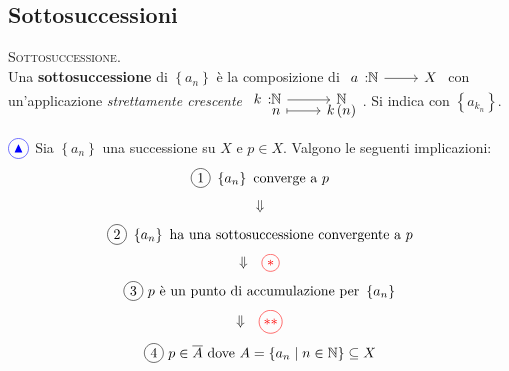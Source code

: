 \subsection{Sottosuccessioni}
\begin{define}\textsc{Sottosuccessione.}\\
Una \textbf{sottosuccessione} di $\left\{a_n\right\}$ è la composizione di $\funz{a}{\naturalset}{X}$ con un'applicazione \textit{strettamente crescente} $\funztot{k}{\naturalset}{\naturalset}{n}{k\left(n\right)}$. Si indica con $\left\{a_{k_n}\right\}$.
\end{define}
\begin{lemming}\label{lemmatriangolino} $\textcolor{blue}{\circled{{\large \blacktriangle}}}$ 	Sia $\left\{a_n\right\}$ una successione su $X$ e $p\in X$. Valgono le seguenti implicazioni:
	\begin{equation}
		\circled{1}\ \left\{a_n\right\}\text{ converge a }p
	\end{equation}
\begin{equation*}
	\begin{array}{ll}
	\Downarrow 
\end{array}
\end{equation*}
\begin{equation}
		\circled{2}\ \left\{a_n\right\}\text{ ha una sottosuccessione convergente a }p
\end{equation}
\begin{equation*}
\begin{array}{ll}
	\Downarrow &  \textcolor{red}{\circled{\ast}}
\end{array}
\end{equation*}
\begin{equation}
	\circled{3}\ p\text{ è un punto di accumulazione per }\left\{a_n\right\}
\end{equation}
	\begin{equation*}
	\begin{array}{ll}
		\Downarrow & \textcolor{red}{\circled{\ast\ast}}
	\end{array}
\end{equation*}
\begin{equation}
	\circled{4}\ p\in\overline{A}\text{ dove }A=\left\{a_n\mid n\in \naturalset\right\}\subseteq X
\end{equation}
\vspace{-6mm}
\end{lemming}
